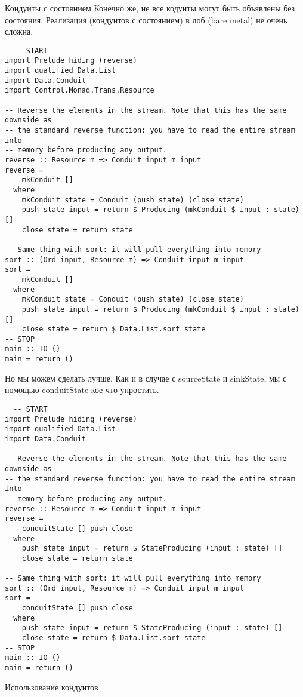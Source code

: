 Кондуиты с состоянием
%
Конечно же, не все кодуиты могут быть объявлены без состояния.  Реализация (кондуитов с состоянием) в лоб (bare metal) не очень сложна.
\begin{lstlisting}
  -- START
import Prelude hiding (reverse)
import qualified Data.List
import Data.Conduit
import Control.Monad.Trans.Resource

-- Reverse the elements in the stream. Note that this has the same downside as
-- the standard reverse function: you have to read the entire stream into
-- memory before producing any output.
reverse :: Resource m => Conduit input m input
reverse =
    mkConduit []
  where
    mkConduit state = Conduit (push state) (close state)
    push state input = return $ Producing (mkConduit $ input : state) []
    close state = return state

-- Same thing with sort: it will pull everything into memory
sort :: (Ord input, Resource m) => Conduit input m input
sort =
    mkConduit []
  where
    mkConduit state = Conduit (push state) (close state)
    push state input = return $ Producing (mkConduit $ input : state) []
    close state = return $ Data.List.sort state
-- STOP
main :: IO ()
main = return ()
\end{lstlisting} 
Но мы можем сделать лучше. Как и в случае с sourceState и sinkState, мы с помощью conduitState кое-что упростить.
\begin{lstlisting}
  -- START
import Prelude hiding (reverse)
import qualified Data.List
import Data.Conduit

-- Reverse the elements in the stream. Note that this has the same downside as
-- the standard reverse function: you have to read the entire stream into
-- memory before producing any output.
reverse :: Resource m => Conduit input m input
reverse =
    conduitState [] push close
  where
    push state input = return $ StateProducing (input : state) []
    close state = return state

-- Same thing with sort: it will pull everything into memory
sort :: (Ord input, Resource m) => Conduit input m input
sort =
    conduitState [] push close
  where
    push state input = return $ StateProducing (input : state) []
    close state = return $ Data.List.sort state
-- STOP
main :: IO ()
main = return ()
\end{lstlisting}
Использование кондуитов

